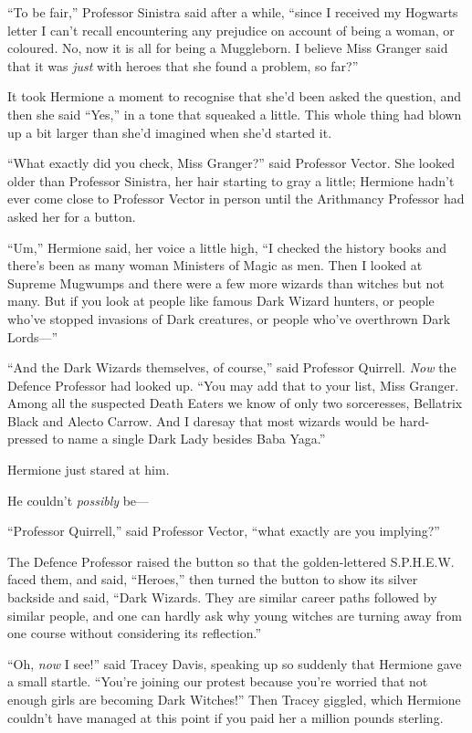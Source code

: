 ``To be fair,'' Professor Sinistra said after a while, ``since I
received my Hogwarts letter I can't recall encountering any prejudice on
account of being a woman, or coloured. No, now it is all for being a
Muggleborn. I believe Miss Granger said that it was \emph{just} with
heroes that she found a problem, so far?''

It took Hermione a moment to recognise that she'd been asked the
question, and then she said ``Yes,'' in a tone that squeaked a little.
This whole thing had blown up a bit larger than she'd imagined when
she'd started it.

``What exactly did you check, Miss Granger?'' said Professor Vector. She
looked older than Professor Sinistra, her hair starting to gray a
little; Hermione hadn't ever come close to Professor Vector in person
until the Arithmancy Professor had asked her for a button.

``Um,'' Hermione said, her voice a little high, ``I checked the history
books and there's been as many woman Ministers of Magic as men. Then I
looked at Supreme Mugwumps and there were a few more wizards than
witches but not many. But if you look at people like famous Dark Wizard
hunters, or people who've stopped invasions of Dark creatures, or people
who've overthrown Dark Lords---''

``And the Dark Wizards themselves, of course,'' said Professor Quirrell.
\emph{Now} the Defence Professor had looked up. ``You may add that to
your list, Miss Granger. Among all the suspected Death Eaters we know of
only two sorceresses, Bellatrix Black and Alecto Carrow. And I daresay
that most wizards would be hard-pressed to name a single Dark Lady
besides Baba Yaga.''

Hermione just stared at him.

He couldn't \emph{possibly} be---

``Professor Quirrell,'' said Professor Vector, ``what exactly are you
implying?''

The Defence Professor raised the button so that the golden-lettered
S.P.H.E.W. faced them, and said, ``Heroes,'' then turned the button to
show its silver backside and said, ``Dark Wizards. They are similar
career paths followed by similar people, and one can hardly ask why
young witches are turning away from one course without considering its
reflection.''

``Oh, \emph{now} I see!'' said Tracey Davis, speaking up so suddenly
that Hermione gave a small startle. ``You're joining our protest because
you're worried that not enough girls are becoming Dark Witches!'' Then
Tracey giggled, which Hermione couldn't have managed at this point if
you paid her a million pounds sterling.

